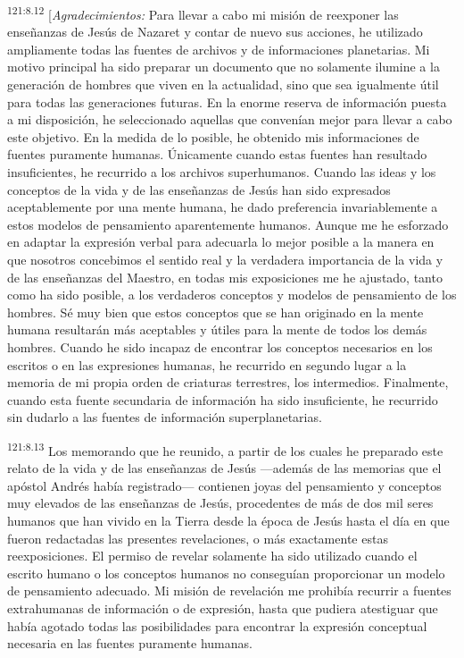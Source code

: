 \par
\textsuperscript{121:8.12} [\textit{Agradecimientos:} Para llevar a cabo mi misión de reexponer las enseñanzas de Jesús de Nazaret y contar de nuevo sus acciones, he utilizado ampliamente todas las fuentes de archivos y de informaciones planetarias. Mi motivo principal ha sido preparar un documento que no solamente ilumine a la generación de hombres que viven en la actualidad, sino que sea igualmente útil para todas las generaciones futuras. En la enorme reserva de información puesta a mi disposición, he seleccionado aquellas que convenían mejor para llevar a cabo este objetivo. En la medida de lo posible, he obtenido mis informaciones de fuentes puramente humanas. Únicamente cuando estas fuentes han resultado insuficientes, he recurrido a los archivos superhumanos. Cuando las ideas y los conceptos de la vida y de las enseñanzas de Jesús han sido expresados aceptablemente por una mente humana, he dado preferencia invariablemente a estos modelos de pensamiento aparentemente humanos. Aunque me he esforzado en adaptar la expresión verbal para adecuarla lo mejor posible a la manera en que nosotros concebimos el sentido real y la verdadera importancia de la vida y de las enseñanzas del Maestro, en todas mis exposiciones me he ajustado, tanto como ha sido posible, a los verdaderos conceptos y modelos de pensamiento de los hombres. Sé muy bien que estos conceptos que se han originado en la mente humana resultarán más aceptables y útiles para la mente de todos los demás hombres. Cuando he sido incapaz de encontrar los conceptos necesarios en los escritos o en las expresiones humanas, he recurrido en segundo lugar a la memoria de mi propia orden de criaturas terrestres, los intermedios. Finalmente, cuando esta fuente secundaria de información ha sido insuficiente, he recurrido sin dudarlo a las fuentes de información superplanetarias.

\par
\textsuperscript{121:8.13} Los memorando que he reunido, a partir de los cuales he preparado este relato de la vida y de las enseñanzas de Jesús ---además de las memorias que el apóstol Andrés había registrado--- contienen joyas del pensamiento y conceptos muy elevados de las enseñanzas de Jesús, procedentes de más de dos mil seres humanos que han vivido en la Tierra desde la época de Jesús hasta el día en que fueron redactadas las presentes revelaciones, o más exactamente estas reexposiciones. El permiso de revelar solamente ha sido utilizado cuando el escrito humano o los conceptos humanos no conseguían proporcionar un modelo de pensamiento adecuado. Mi misión de revelación me prohibía recurrir a fuentes extrahumanas de información o de expresión, hasta que pudiera atestiguar que había agotado todas las posibilidades para encontrar la expresión conceptual necesaria en las fuentes puramente humanas.

